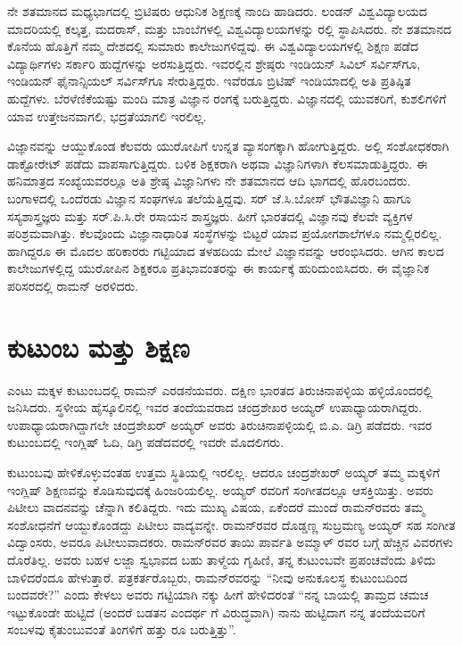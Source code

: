 ನೇ ಶತಮಾನದ ಮಧ್ಯಭಾಗದಲ್ಲಿ ಬ್ರಿಟಿಷರು ಆಧುನಿಕ ಶಿಕ್ಷಣಕ್ಕೆ ನಾಂದಿ ಹಾಡಿದರು. ಲಂಡನ್ ವಿಶ್ವವಿದ್ಯಾಲಯದ ಮಾದರಿಯಲ್ಲಿ ಕಲ್ಕತ್ತ, ಮದರಾಸ್, ಮತ್ತು ಬಾಂಬೆಗಳಲ್ಲಿ ವಿಶ್ವವಿದ್ಯಾಲಯಗಳನ್ನು ರಲ್ಲಿ ಸ್ಥಾಪಿಸಿದರು. ನೇ ಶತಮಾನದ ಕೊನೆಯ ಹೊತ್ತಿಗೆ ನಮ್ಮ ದೇಶದಲ್ಲಿ ಸುಮಾರು  ಕಾಲೇಜುಗಳಿದ್ದವು. ಈ ವಿಶ್ವವಿದ್ಯಾಲಯಗಳಲ್ಲಿ ಶಿಕ್ಷಣ ಪಡೆದ ವಿದ್ಯಾರ್ಥಿಗಳು ಸರ್ಕಾರಿ ಹುದ್ದೆಗಳನ್ನು ಅರಸುತ್ತಿದ್ದರು. ಇವರಲ್ಲಿನ ಶ್ರೇಷ್ಠರು ಇಂಡಿಯನ್ ಸಿವಿಲ್ ಸರ್ವಿಸ್‍ಗೂ, ಇಂಡಿಯನ್ ಫೈನಾನ್ಸಿಯಲ್ ಸರ್ವಿಸ್‍ಗೂ ಸೇರುತ್ತಿದ್ದರು. ಇವೆರಡೂ ಬ್ರಿಟಿಷ್ ಇಂಡಿಯಾದಲ್ಲಿ ಅತಿ ಪ್ರತಿಷ್ಠಿತ ಹುದ್ದೆಗಳು. ಬೆರಳೆಣಿಕೆಯಷ್ಟು ಮಂದಿ ಮಾತ್ರ ವಿಜ್ಞಾನ ರಂಗಕ್ಕೆ ಬರುತ್ತಿದ್ದರು. ವಿಜ್ಞಾನದಲ್ಲಿ ಯುವಕರಿಗೆ, ಕುಶಲಿಗಳಿಗೆ ಯಾವ ಉತ್ತೇಜನವಾಗಲಿ, ಭದ್ರತೆಯಾಗಲಿ ಇರಲಿಲ್ಲ.

ವಿಜ್ಞಾನವನ್ನು ಆಯ್ದುಕೊಂಡ ಕೆಲವರು ಯುರೋಪಿಗೆ ಉನ್ನತ ವ್ಯಾಸಂಗಕ್ಕಾಗಿ ಹೋಗುತ್ತಿದ್ದರು. ಅಲ್ಲಿ ಸಂಶೋಧಕರಾಗಿ ಡಾಕ್ಟೋರೇಟ್ ಪಡೆದು ವಾಪಸಾಗುತ್ತಿದ್ದರು. ಬಳಿಕ ಶಿಕ್ಷಕರಾಗಿ ಅಥವಾ ವಿಜ್ಞಾನಿಗಳಾಗಿ ಕೆಲಸಮಾಡುತ್ತಿದ್ದರು. ಈ ಹನಿಮಾತ್ರದ ಸಂಖ್ಯೆಯವರಲ್ಲೂ ಅತಿ ಶ್ರೇಷ್ಠ ವಿಜ್ಞಾನಿಗಳು ನೇ ಶತಮಾನದ ಆದಿ ಭಾಗದಲ್ಲಿ ಹೊರಬಂದರು. ಬಂಗಾಳದಲ್ಲಿ ಒಂದೆರಡು ವಿಜ್ಞಾನ ಸಂಘಗಳೂ ತಲೆಯೆತ್ತಿದ್ದವು. ಸರ್ ಜೆ.ಸಿ.ಬೋಸ್ ಭೌತವಿಜ್ಞಾನಿ ಹಾಗೂ ಸಸ್ಯಶಾಸ್ತ್ರಜ್ಞರು ಮತ್ತು ಸರ್.ಪಿ.ಸಿ.ರೇ ರಸಾಯನ ಶಾಸ್ತ್ರಜ್ಞರು. ಹೀಗೆ ಭಾರತದಲ್ಲಿ ವಿಜ್ಞಾನವು ಕೆಲವೇ ವ್ಯಕ್ತಿಗಳ ಪರಿಶ್ರಮವಾಗಿತ್ತು. ಕೆಲವೊಂದು ವಿಜ್ಞಾನಾಧಾರಿತ ಸಂಸ್ಥೆಗಳನ್ನು ಬಿಟ್ಟರೆ ಯಾವ ಪ್ರಯೋಗಶಾಲೆಗಳೂ ನಮ್ಮಲ್ಲಿರಲಿಲ್ಲ. ಹಾಗಿದ್ದರೂ ಈ ಮೊದಲ ಹರಿಕಾರರು ಗಟ್ಟಿಯಾದ ತಳಹದಿಯ ಮೇಲೆ ವಿಜ್ಞಾನವನ್ನು ಆರಂಭಿಸಿದರು. ಆಗಿನ ಕಾಲದ ಕಾಲೇಜುಗಳಲ್ಲಿದ್ದ ಯುರೋಪಿನ ಶಿಕ್ಷಕರೂ ಪ್ರತಿಭಾವಂತರನ್ನು ಈ ಕಾರ್ಯಕ್ಕೆ ಹುರಿದುಂಬಿಸಿದರು. ಈ ವೈಜ್ಞಾನಿಕ ಪರಿಸರದಲ್ಲಿ ರಾಮನ್ ಅರಳಿದರು.


\section{ಕುಟುಂಬ ಮತ್ತು ಶಿಕ್ಷಣ}

ಎಂಟು ಮಕ್ಕಳ ಕುಟುಂಬದಲ್ಲಿ ರಾಮನ್ ಎರಡನೆಯವರು. ದಕ್ಷಿಣ ಭಾರತದ ತಿರುಚಿನಾಪಳ್ಳಿಯ ಹಳ್ಳಿಯೊಂದರಲ್ಲಿ ಜನಿಸಿದರು. ಸ್ಥಳೀಯ ಹೈಸ್ಕೂಲಿನಲ್ಲಿ ಇವರ ತಂದೆಯವರಾದ ಚಂದ್ರಶೇಖರ ಅಯ್ಯರ್ ಉಪಾಧ್ಯಾಯರಾಗಿದ್ದರು. ಉಪಾಧ್ಯಾಯರಾಗಿದ್ದಾಗಲೇ ಚಂದ್ರಶೇಖರ್ ಅಯ್ಯರ್ ಅವರು ತಿರುಚಿನಾಪಳ್ಳಿಯಲ್ಲಿ ಬಿ.ಎ. ಡಿಗ್ರಿ ಪಡೆದರು. ಇವರ ಕುಟುಂಬದಲ್ಲಿ ಇಂಗ್ಲಿಷ್ ಓದಿ, ಡಿಗ್ರಿ ಪಡೆದವರಲ್ಲಿ ಇವರೇ ಮೊದಲಿಗರು.

ಕುಟುಂಬವು ಹೇಳಿಕೊಳ್ಳುವಂತಹ ಉತ್ತಮ ಸ್ಥಿತಿಯಲ್ಲಿ ಇರಲಿಲ್ಲ. ಆದರೂ ಚಂದ್ರಶೇಖರ್ ಅಯ್ಯರ್ ತಮ್ಮ ಮಕ್ಕಳಿಗೆ ಇಂಗ್ಲಿಷ್ ಶಿಕ್ಷಣವನ್ನು ಕೊಡಿಸುವುದಕ್ಕೆ ಹಿಂಜರಿಯಲಿಲ್ಲ. ಅಯ್ಯರ್ ರವರಿಗೆ ಸಂಗೀತದಲ್ಲೂ ಆಸಕ್ತಿಯಿತ್ತು. ಅವರು ಪಿಟೀಲು ವಾದನವನ್ನು ಚೆನ್ನಾಗಿ ಕಲಿತಿದ್ದರು. ಇದು ಮುಖ್ಯ ವಿಷಯ, ಏಕೆಂದರೆ ಮುಂದೆ ರಾಮನ್‍ರವರು ತಮ್ಮ ಸಂಶೋಧನೆಗೆ ಆಯ್ದುಕೊಂಡದ್ದು ಪಿಟೀಲು ವಾದ್ಯವನ್ನೇ. ರಾಮನ್‍ರವರ ದೊಡ್ಡಣ್ಣ ಸುಬ್ರಮಣ್ಯ ಅಯ್ಯರ್ ಸಹ ಸಂಗೀತ ವಿದ್ವಾಂಸರು, ಅವರೂ ಪಿಟೀಲುವಾದಕರು. ರಾಮನ್‍ರವರ ತಾಯಿ ಪಾರ್ವತಿ ಅಮ್ಮಾಳ್ ರವರ ಬಗ್ಗೆ ಹೆಚ್ಚಿನ ವಿವರಗಳು ದೊರೆತಿಲ್ಲ. ಅವರು ಬಹಳ ಲಜ್ಜಾ ಸ್ವಭಾವದ ಬಹು ತಾಳ್ಮೆಯ ಗೃಹಿಣಿ, ತನ್ನ ಕುಟುಂಬವೇ ಪ್ರಪಂಚವೆಂದು ತಿಳಿದು ಬಾಳಿದರೆಂದೂ ಹೇಳುತ್ತಾರೆ. ಪತ್ರಕರ್ತರೊಬ್ಬರು, ರಾಮನ್‍ರವರನ್ನು “ನೀವು ಅನುಕೂಲಸ್ಥ ಕುಟುಂಬದಿಂದ ಬಂದವರೇ?” ಎಂದು ಕೇಳಲು ಅವರು ಗಟ್ಟಿಯಾಗಿ ನಕ್ಕು ಹೀಗೆ ಹೇಳಿದರಂತೆ “ನನ್ನ ಬಾಯಲ್ಲಿ ತಾಮ್ರದ ಚಮಚ ಇಟ್ಟುಕೊಂಡೇ ಹುಟ್ಟಿದೆ (ಅಂದರೆ ಬಡತನ ಎಂದರ್ಥ ಗೆ ವಿರುದ್ಧವಾಗಿ) ನಾನು ಹುಟ್ಟಿದಾಗ ನನ್ನ ತಂದೆಯವರಿಗೆ ಸಂಬಳವು ಕೈತುಂಬುವಂತೆ ತಿಂಗಳಿಗೆ ಹತ್ತು ರೂ ಬರುತ್ತಿತ್ತು”.

